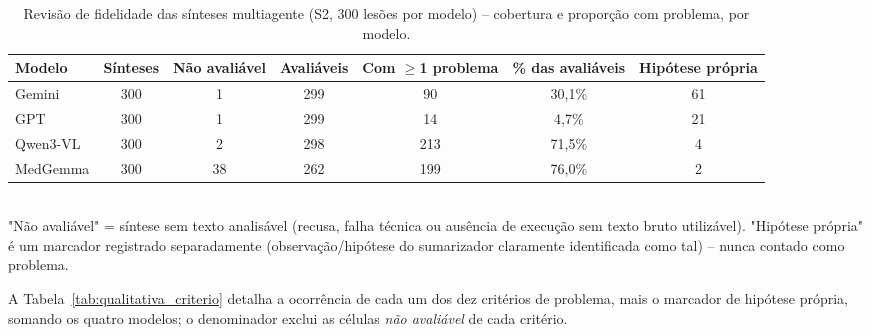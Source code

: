 \begin{table}[H]
	\centering
	\caption{Revisão de fidelidade das sínteses multiagente (S2, 300 lesões por modelo) -- cobertura e proporção com problema, por modelo.}
	\label{tab:qualitativa_modelo}
	\begin{tabular}{lcccccc}
		\hline
		\textbf{Modelo} & \textbf{Sínteses} & \textbf{Não avaliável} & \textbf{Avaliáveis} & \textbf{Com $\geq$1 problema} & \textbf{\% das avaliáveis} & \textbf{Hipótese própria} \\
		\hline
		Gemini & 300 & 1 & 299 & 90 & 30,1\% & 61 \\
		GPT & 300 & 1 & 299 & 14 & 4,7\% & 21 \\
		Qwen3-VL & 300 & 2 & 298 & 213 & 71,5\% & 4 \\
		MedGemma & 300 & 38 & 262 & 199 & 76,0\% & 2 \\
		\hline
	\end{tabular}
	\\ \footnotesize "Não avaliável" = síntese sem texto analisável (recusa, falha técnica ou ausência de execução sem texto bruto utilizável). "Hipótese própria" é um marcador registrado separadamente (observação/hipótese do sumarizador claramente identificada como tal) -- nunca contado como problema.
\end{table}

A Tabela~\ref{tab:qualitativa_criterio} detalha a ocorrência de cada um dos dez critérios de problema, mais o marcador de hipótese própria, somando os quatro modelos; o denominador exclui as células \textit{não avaliável} de cada critério.

